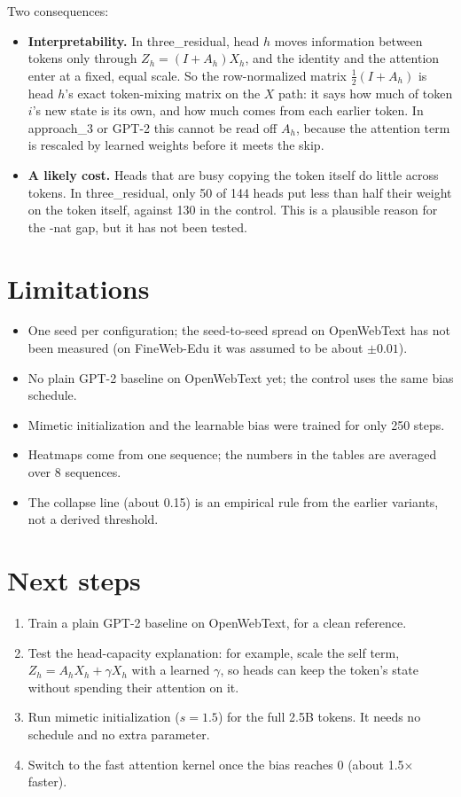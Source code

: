 \documentclass[11pt]{article}
\newcommand{\tr}{three\_residual}
\begin{document}
Two consequences:
\begin{itemize}
\item \textbf{Interpretability.} In \tr{}, head $h$ moves information between tokens only through
$Z_h = (I + A_h)X_h$, and the identity and the attention enter at a fixed, equal scale. So the row-normalized
matrix $\tfrac12(I + A_h)$ is head $h$'s exact token-mixing matrix on the $X$ path: it says how much of token
$i$'s new state is its own, and how much comes from each earlier token. In approach\_3 or GPT-2 this cannot be
read off $A_h$, because the attention term is rescaled by learned weights before it meets the skip.
\item \textbf{A likely cost.} Heads that are busy copying the token itself do little across tokens. In \tr{}, only
50 of 144 heads put less than half their weight on the token itself, against 130 in the control. This is a plausible reason for the
\GapBase{}-nat gap, but it has not been tested.
\end{itemize}

\section{Limitations}
\begin{itemize}
\item One seed per configuration; the seed-to-seed spread on OpenWebText has not been measured (on FineWeb-Edu it
was assumed to be about $\pm0.01$).
\item No plain GPT-2 baseline on OpenWebText yet; the control uses the same bias schedule.
\item Mimetic initialization and the learnable bias were trained for only 250 steps.
\item Heatmaps come from one sequence; the numbers in the tables are averaged over 8 sequences.
\item The collapse line (about 0.15) is an empirical rule from the earlier variants, not a derived threshold.
\end{itemize}

\section{Next steps}
\begin{enumerate}
\item Train a plain GPT-2 baseline on OpenWebText, for a clean reference.
\item Test the head-capacity explanation: for example, scale the self term, $Z_h = A_hX_h + \gamma X_h$ with a
learned $\gamma$, so heads can keep the token's state without spending their attention on it.
\item Run mimetic initialization ($s=1.5$) for the full 2.5B tokens. It needs no schedule and no extra
parameter.
\item Switch to the fast attention kernel once the bias reaches 0 (about 1.5$\times$ faster).
\end{enumerate}
\end{document}
